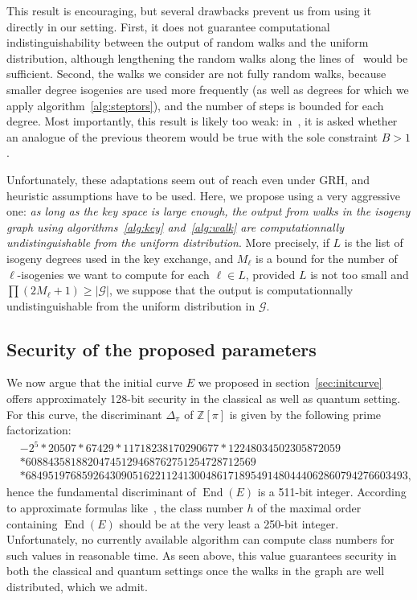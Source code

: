 \documentclass{article}
\newcommand{\Z}{\mathbb{Z}}
\newcommand{\Graph}{\mathcal{G}}
\theoremstyle{definition}
\DeclareMathOperator{\End}{End}
\begin{document}
This result is encouraging, but several drawbacks prevent us from
using it directly in our setting. First, it does not guarantee
computational indistinguishability between the output of random
walks and the uniform distribution, although lengthening the
random walks along the lines of~\cite[Theorem ...]{todo:expanders}
would be sufficient. Second, the walks we consider are not fully random
walks, because smaller degree isogenies are used more frequently
(as well as degrees for which we apply algorithm~\ref{alg:steptors}),
and the number of steps is bounded for each degree. Most
importantly, this result is likely too weak: in~\cite[7.2]{jao+miller+venkatesan09},
it is asked whether an analogue of the previous theorem would
be true with the sole constraint $B>1$.

Unfortunately, these adaptations seem out of reach even under
GRH, and heuristic assumptions have to be used. Here, we propose using
a very aggressive one: \emph{as long as the key space is large
enough, the output from walks in the isogeny graph using algorithms~\ref{alg:key}
and~\ref{alg:walk} are computationnally undistinguishable from the uniform
distribution}. More precisely, if $L$ is the list of isogeny degrees used
in the key exchange, and $M_\ell$ is a bound for the number of $\ell$-isogenies
we want to compute for each $\ell\in L$, provided $L$ is not too small
and $\prod (2 M_\ell + 1) \geq |\Graph|$, we suppose that
the output is computationnally
undistinguishable from the uniform distribution in $\Graph$.

\subsection{Security of the proposed parameters}

We now argue that the initial curve $E$ we proposed in section~\ref{sec:initcurve}
offers approximately 128-bit security in the classical as well as quantum
setting. For this curve, the discriminant $\Delta_\pi$ of $\Z[\pi]$ is
given by the following prime factorization:
\[
\begin{aligned}
& -2^5 * 20507 * 67429 * 11718238170290677 * 12248034502305872059 \\
& * 60884358188204745129468762751254728712569\\
& * 68495197685926430905162211241300486171895491480444062860794276603493,
\end{aligned}
\]
hence the fundamental discriminant of $\End(E)$ is a 511-bit integer.
According to approximate formulas like~\cite{todo:classnumbers},
the class number $h$ of the maximal order containing $\End(E)$ should
be at the very least a 250-bit integer. Unfortunately,
no currently available algorithm can compute class numbers for such values
in reasonable time. As seen above, this value guarantees security
in both the classical and quantum settings once the walks in
the graph are well distributed, which we admit.
\end{document}
